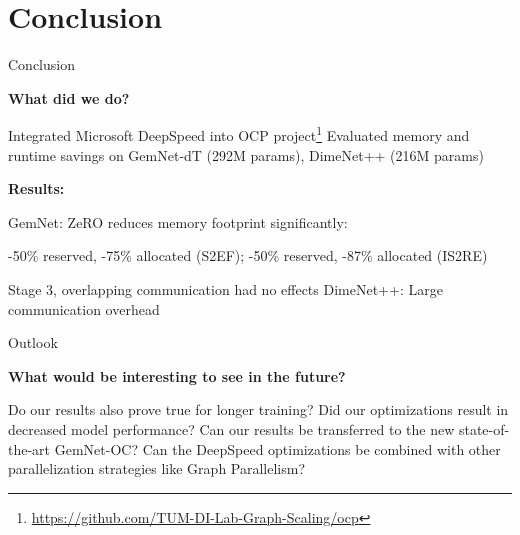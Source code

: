 \section{Conclusion}

\begin{frame}{Conclusion}
    \begin{small}
        \textbf{What did we do?} \vspace*{-0.3cm} 
        \begin{itemize}
            \bitem Integrated Microsoft DeepSpeed into OCP project\footnote{\url{https://github.com/TUM-DI-Lab-Graph-Scaling/ocp}} \vspace*{-0.3cm} 
            \bitem Evaluated memory and runtime savings on GemNet-dT (292M params), DimeNet++ (216M params) \vspace*{-0.3cm} 
        \end{itemize}
        \textbf{Results:} \vspace*{-0.3cm}
        \begin{itemize}
            \bitem GemNet: ZeRO reduces memory footprint significantly: \vspace*{-0.3cm} \\
            \begin{center}
                -50\% reserved, -75\% allocated (S2EF); -50\% reserved, -87\% allocated (IS2RE) \vspace*{-0.3cm} 
            \end{center}
            \bitem Stage 3, overlapping communication had no effects \vspace*{-0.3cm} 
            \bitem DimeNet++: Large communication overhead 
        \end{itemize}
    \end{small}
\end{frame}

\begin{frame}{Outlook}
    \begin{small}
        \textbf{What would be interesting to see in the future?} 
        \begin{itemize}
            \bitem Do our results also prove true for longer training? 
            \bitem Did our optimizations result in decreased model performance? 
            \bitem Can our results be transferred to the new state-of-the-art GemNet-OC? 
            \bitem Can the DeepSpeed optimizations be combined with other parallelization strategies 
            like Graph Parallelism?
        \end{itemize}
    \end{small}
\end{frame}